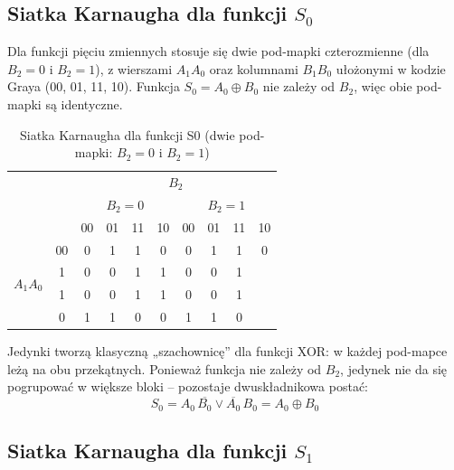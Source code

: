 \documentclass[11pt]{article}
\begin{document}
\subsection{Siatka Karnaugha dla funkcji \(S_0\)}

Dla funkcji pięciu zmiennych stosuje się dwie pod-mapki czterozmienne (dla \(B_2=0\) i \(B_2=1\)), z wierszami \(A_1A_0\) oraz kolumnami \(B_1B_0\) ułożonymi w kodzie Graya (00, 01, 11, 10). Funkcja \(S_0 = A_0 \oplus B_0\) nie zależy od \(B_2\), więc obie pod-mapki są identyczne.
\begin{table}[H]
\centering
\caption{Siatka Karnaugha dla funkcji S0 (dwie pod-mapki: $B_2=0$ i $B_2=1$)}
\label{tab:kmap_S0}
\setlength{\tabcolsep}{5.5pt}
\begin{tabular}{cc|c|c|c|c|c|c|c|c}
\multicolumn{2}{c}{} & \multicolumn{8}{c}{$B_2$} \\
\multicolumn{2}{c}{} & \multicolumn{4}{c}{$B_2=0$} & \multicolumn{4}{c}{$B_2=1$} \\
\multicolumn{2}{c}{} & 00 & 01 & 11 & 10 & 00 & 01 & 11 & 10 \\
\hline
\multirow{4}{*}{$A_1A_0$} & 00 & 0 & 1 & 1 & 0 & 0 & 1 & 1 & 0 \\
01 & 1 & 0 & 0 & 1 & 1 & 0 & 0 & 1 \\
11 & 1 & 0 & 0 & 1 & 1 & 0 & 0 & 1 \\
10 & 0 & 1 & 1 & 0 & 0 & 1 & 1 & 0 \\
\hline
\end{tabular}
\end{table}

Jedynki tworzą klasyczną „szachownicę” dla funkcji XOR: w każdej pod-mapce leżą na obu przekątnych. Ponieważ funkcja nie zależy od \(B_2\), jedynek nie da się pogrupować w większe bloki -- pozostaje dwuskładnikowa postać:
\begin{equation}
S_0 = A_0\,\overline{B_0} \lor \overline{A_0}\,B_0 = A_0 \oplus B_0
\end{equation}
\subsection{Siatka Karnaugha dla funkcji \(S_1\)}
\end{document}
